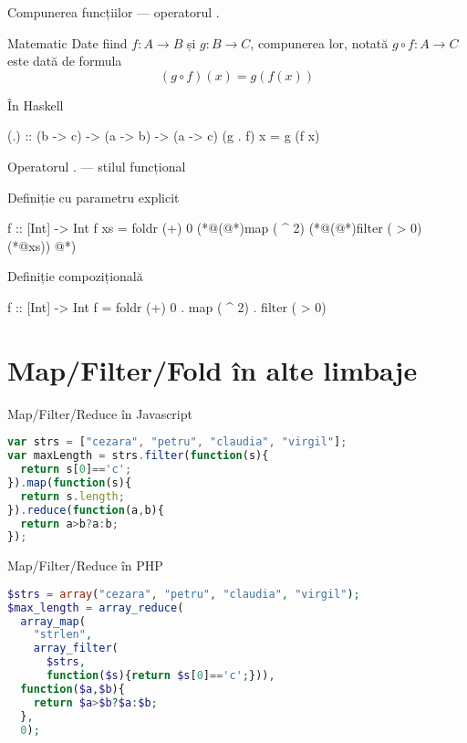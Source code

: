 \documentclass[handout,xcolor=pdftex,romanian,colorlinks]{beamer}
\begin{document}
\begin{frame}[fragile]{Compunerea funcțiilor --- operatorul $.$}
\begin{block}{Matematic}
Date fiind $f : A \rightarrow B$ și $g : B \rightarrow C$, compunerea lor, notată
$g \circ f : A \rightarrow C$ este dată de formula \[(g \circ f)(x) = g(f(x))\]
\end{block}

\begin{block}{În Haskell}
\begin{asciihs}
(.) :: (b -> c) -> (a -> b) -> (a -> c)
(g . f) x = g (f x)
\end{asciihs}
\end{block}
\end{frame}

\begin{frame}[fragile]{Operatorul $.$ --- stilul funcțional}
\begin{block}{Definiție cu parametru explicit}
\begin{asciihs}
f :: [Int] -> Int
f xs = foldr (+) 0 (*@\color{blue}(@*)map ( ^ 2)  (*@\color{blue}(@*)filter ( > 0) (*@\color{blue}xs)) @*)
\end{asciihs}
\end{block}

\begin{block}{Definiție compozițională}
\begin{asciihs}
f :: [Int] -> Int
f = foldr (+) 0 . map ( ^ 2) . filter ( > 0)
\end{asciihs}
\end{block}
\end{frame}




\section{Map/Filter/Fold în alte limbaje}

\begin{frame}[fragile]{Map/Filter/Reduce în Javascript}
\begin{lstlisting}[language=JavaScript,basicstyle=\small]
var strs = ["cezara", "petru", "claudia", "virgil"];
var maxLength = strs.filter(function(s){
  return s[0]=='c';
}).map(function(s){
  return s.length;
}).reduce(function(a,b){
  return a>b?a:b;
});
\end{lstlisting}
\end{frame}


\begin{frame}[fragile]{Map/Filter/Reduce în PHP}
\begin{lstlisting}[language=PHP,basicstyle=\small,morekeywords={array_reduce}]
$strs = array("cezara", "petru", "claudia", "virgil");
$max_length = array_reduce(
  array_map(
    "strlen",
    array_filter(
      $strs,
      function($s){return $s[0]=='c';})),
  function($a,$b){
    return $a>$b?$a:$b;
  }, 
  0);
\end{lstlisting}
\end{frame}
\end{document}
